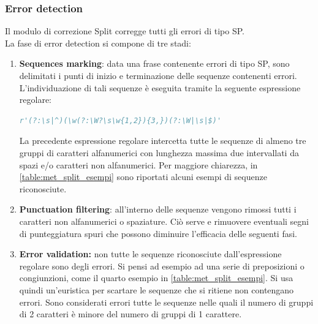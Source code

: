 \subsubsection{Error detection}
\label{sec:met_split_errdet}
Il modulo di correzione Split corregge tutti gli errori di tipo SP.\\
La fase di error detection si compone di tre stadi:
\begin{enumerate}
\item \textbf{Sequences marking}: data una frase contenente errori di tipo SP, sono delimitati i punti di inizio e terminazione delle sequenze contenenti errori. L'individuazione di tali sequenze è eseguita tramite la seguente espressione regolare:
\begin{lstlisting}[language=Python]
r'(?:\s|^)(\w(?:\W?\s\w{1,2}){3,})(?:\W|\s|$)'
\end{lstlisting}
La precedente espressione regolare intercetta tutte le sequenze di almeno tre gruppi di caratteri alfanumerici con lunghezza massima due intervallati da spazi e/o caratteri non alfanumerici. Per maggiore chiarezza, in \autoref{table:met_split_esempi} sono riportati alcuni esempi di sequenze riconosciute.

\item \textbf{Punctuation filtering}: all'interno delle sequenze vengono rimossi tutti i caratteri non alfanumerici o spaziature. Ciò serve e rimuovere eventuali segni di punteggiatura spuri che possono diminuire l'efficacia delle seguenti fasi.

\item \textbf{Error validation:} non tutte le sequenze riconosciute dall'espressione regolare sono degli errori. Si pensi ad esempio ad una serie di preposizioni o congiunzioni, come il quarto esempio in \autoref{table:met_split_esempi}. Si usa quindi un'euristica per scartare le sequenze che si ritiene non contengano errori. Sono considerati errori tutte le sequenze nelle quali il numero di gruppi di 2 caratteri è minore del numero di gruppi di 1 carattere.

\end{enumerate}


